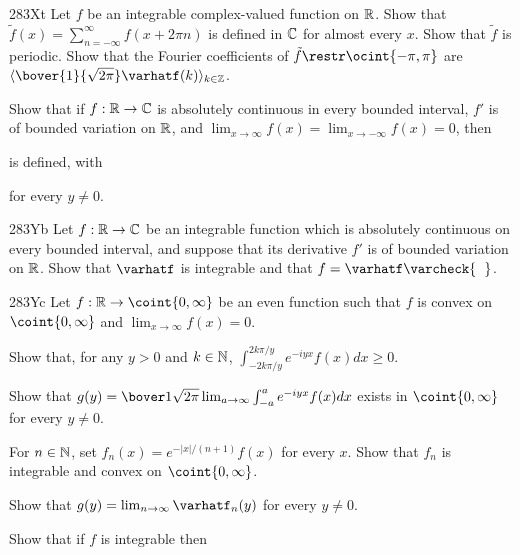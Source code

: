 {\spheader 283Xt Let $f$ be an integrable complex-valued function on
$\Bbb R$.   Show that $\tilde f(x)=\sum_{n=-\infty}^{\infty}f(x+2\pi n)$
is defined in $\Bbb C$ for almost every $x$.
   Show that $\tilde f$ is periodic.   Show that the
Fourier coefficients of $\tilde f\restr\ocint{-\pi,\pi}$ are
$\langle\bover{1}{\sqrt{2\pi}}\varhatf(k)\rangle_{k\in\Bbb Z}$.

Show that if $f:\Bbb R\to\Bbb C$ is
absolutely continuous in every bounded interval, $f'$ is of bounded
variation on $\Bbb R$, and
$\lim_{x\to\infty}f(x)=\lim_{x\to-\infty}f(x)=0$, then


\noindent is defined, with


\noindent for every $y\ne 0$.

\spheader 283Yb Let $f:\Bbb R\to\Bbb C$ be an integrable
function which is absolutely continuous on every bounded interval, and
suppose that its derivative $f'$ is of bounded variation on $\Bbb R$.
Show that $\varhatf$ is integrable and that
$f=\varhatf\varcheck{\phantom{f}}$.   

\spheader 283Yc Let $f:\Bbb R\to\coint{0,\infty}$ be an even
function such that $f$ is convex on $\coint{0,\infty}$
and $\lim_{x\to\infty}f(x)=0$.

 Show that, for any $y>0$ and $k\in\Bbb N$,
$\int_{-2k\pi/y}^{2k\pi/y}e^{-iyx}f(x)dx\ge 0$.

 Show that
$g(y)=\bover1{\sqrt{2\pi}}\lim_{a\to\infty}\int_{-a}^ae^{-iyx}f(x)dx$
exists in $\coint{0,\infty}$ for every $y\ne 0$.

 For $n\in\Bbb N$, set $f_n(x)
=e^{-|x|/(n+1)}f(x)$ for every $x$.   Show that $f_n$ is integrable and
convex on $\coint{0,\infty}$.

 Show that $g(y)=\lim_{n\to\infty}\varhatf_{n}(y)$ for
every $y\ne 0$.

 Show that if $f$ is integrable then


}
